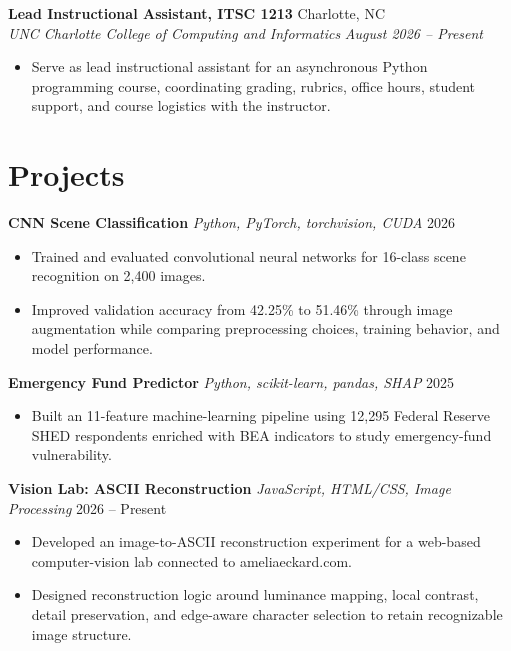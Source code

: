 \documentclass[letterpaper,10pt]{article}
\newcommand{\resumeentry}[4]{
  \noindent\textbf{#1} \hfill #2 \\
  \textit{#3} \hfill \textit{#4}
}
\newcommand{\projectentry}[3]{
  \noindent\textbf{#1} \textbar{} \textit{#2} \hfill #3
}
\begin{document}
\smallskip

\resumeentry
  {Lead Instructional Assistant, ITSC 1213}{Charlotte, NC}
  {UNC Charlotte College of Computing and Informatics}{August 2026 -- Present}
\begin{itemize}
  \item Serve as lead instructional assistant for an asynchronous Python programming course, coordinating grading, rubrics, office hours, student support, and course logistics with the instructor.
\end{itemize}

\section{Projects}

\projectentry
  {CNN Scene Classification}
  {Python, PyTorch, torchvision, CUDA}
  {2026}
\begin{itemize}
  \item Trained and evaluated convolutional neural networks for 16-class scene recognition on 2,400 images.
  \item Improved validation accuracy from 42.25\% to 51.46\% through image augmentation while comparing preprocessing choices, training behavior, and model performance.
\end{itemize}

\smallskip

\projectentry
  {Emergency Fund Predictor}
  {Python, scikit-learn, pandas, SHAP}
  {2025}
\begin{itemize}
  \item Built an 11-feature machine-learning pipeline using 12,295 Federal Reserve SHED respondents enriched with BEA indicators to study emergency-fund vulnerability.
\end{itemize}

\smallskip

\projectentry
  {Vision Lab: ASCII Reconstruction}
  {JavaScript, HTML/CSS, Image Processing}
  {2026 -- Present}
\begin{itemize}
  \item Developed an image-to-ASCII reconstruction experiment for a web-based computer-vision lab connected to ameliaeckard.com.
  \item Designed reconstruction logic around luminance mapping, local contrast, detail preservation, and edge-aware character selection to retain recognizable image structure.
\end{itemize}
\end{document}
